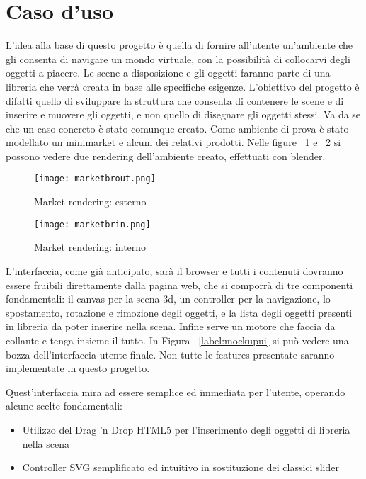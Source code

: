 \section{Caso d'uso}
L'idea alla base di questo progetto è quella di fornire all'utente un'ambiente che gli consenta di navigare un mondo virtuale, con la possibilità di collocarvi degli oggetti a piacere. Le scene a disposizione e gli oggetti faranno parte di una libreria che verrà creata in base alle specifiche esigenze. L'obiettivo del progetto è difatti quello di sviluppare la struttura che consenta di contenere le scene e di inserire e muovere gli oggetti, e non quello di disegnare gli oggetti stessi. Va da se che un caso concreto è stato comunque creato. Come ambiente di prova è stato modellato un minimarket e alcuni dei relativi prodotti. Nelle figure ~\ref{label:marketbrout} e ~\ref{label:marketbrin} si possono vedere due rendering dell'ambiente creato, effettuati con blender.

\begin{figure}[Ht]
\centering
\texttt{[image: marketbrout.png]}
\caption{Market rendering: esterno}
\label{label:marketbrout}
\end{figure}

\begin{figure}[Ht]
\centering
\texttt{[image: marketbrin.png]}
\caption{Market rendering: interno}
\label{label:marketbrin}
\end{figure}

L'interfaccia, come già anticipato, sarà il browser e tutti i contenuti dovranno essere fruibili direttamente dalla pagina web, che si comporrà di tre componenti fondamentali: il canvas per la scena 3d, un controller per la navigazione, lo spostamento, rotazione e rimozione degli oggetti, e la lista degli oggetti presenti in libreria da poter inserire nella scena. Infine serve un motore che faccia da collante e tenga insieme il tutto. In Figura ~\ref{label:mockupui} si può vedere una bozza dell'interfaccia utente finale. Non tutte le features presentate saranno implementate in questo progetto. 

Quest'interfaccia mira ad essere semplice ed immediata per l'utente, operando alcune scelte fondamentali:
\begin{itemize}
    \item Utilizzo del Drag 'n Drop HTML5 per l'inserimento degli oggetti di libreria nella scena
    \item Controller SVG semplificato ed intuitivo in sostituzione dei classici slider
\end{itemize}

